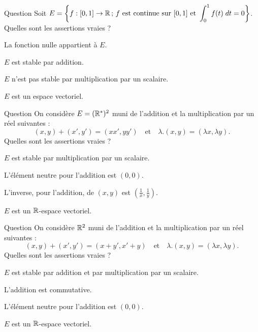 \begin{multi}[multiple,feedback=
{La fonction nulle appartient à \(E\), et \(E\) est stable par addition et par multiplication par un scalaire. Donc \(E\) est un espace vectoriel.
}]{Question}
Soit \(\displaystyle E=\left\{f :[0,1]\to \mathbb{R} \, ; \, f\mbox{ est continue sur }[0,1]   \mbox{ et } \int_0^1 f(t)\; dt =0\right\}\). Quelles sont les assertions vraies ?

    \item* La fonction nulle appartient à \(E\).
    \item* \(E\) est stable par addition.
    \item \(E\) n'est pas stable par multiplication par un scalaire.
    \item* \(E\) est un espace vectoriel.
\end{multi}


\begin{multi}[multiple,feedback=
{On vérifie que l'élément neutre pour l'addition est \((1,1)\), que l'inverse pour l'addition d'un couple \((x,y) \in (\Rr^*)^2\) est \(\displaystyle\left(\frac{1}{x}, \frac{1}{y}\right)\) et que \(E\) n'est pas stable par multiplication par le scalaire zéro. Par conséquent, \(E\) n'est pas un espace vectoriel.
}]{Question}
On considère \(E= (\mathbb{R}^*)^2\) muni de l'addition et la multiplication par un réel suivantes :
\[(x,y)+(x',y')=(xx',yy')\quad \mbox{et}\quad \lambda .(x,y)= (\lambda x,\lambda y).\]
Quelles sont les assertions vraies ?

    \item \(E\) est stable par multiplication par un scalaire.
    \item L'élément neutre pour l'addition est \((0,0)\).
    \item* L'inverse, pour l'addition, de \((x,y)\) est \(\displaystyle \left(\frac{1}{x}, \frac{1}{y}\right)\).
    \item \(E\) est un \(\mathbb{R}\)-espace vectoriel.
\end{multi}


\begin{multi}[multiple,feedback=
{\(E\) est stable par addition et multiplication par un scalaire. On voit que
\[(1,0)+(0,0)=(1,0)\quad \mbox{et}\quad (0,0)+(1,0)=(0,1)\neq (1,0).\] 
On en déduit que l'addition n'est pas commutative et que \((0,0)\) n'est pas un élément neutre pour cette addition. En particulier, \(E\) n'est pas un espace vectoriel.
}]{Question}
On considère \(\mathbb{R}^2\) muni de l'addition et la multiplication par un réel suivantes :
\[(x,y)+(x',y')=(x+y',x'+y)\quad \mbox{et}\quad \lambda . (x,y) = (\lambda x, \lambda y).\]
Quelles sont les assertions vraies ?

    \item* \(E\) est stable par addition et par multiplication par un scalaire.
    \item L'addition est commutative.
    \item L'élément neutre pour l'addition est \((0,0)\).
    \item \(E\) est un \(\mathbb{R}\)-espace vectoriel.
\end{multi}


